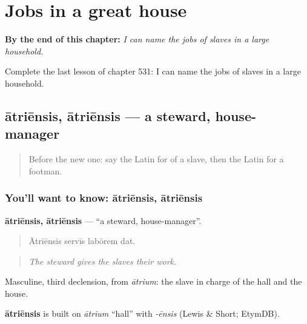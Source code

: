 
\chapter{Jobs in a great house}
\label{ch:la-jobs-in-a-great-house}

\begin{chapteropening}
\textbf{By the end of this chapter:} \emph{I can name the jobs of slaves in a large household.}

Complete the last lesson of chapter 531: I can name the jobs of slaves in a large household.
\end{chapteropening}

\section[ātriēnsis, ātriēnsis]{ātriēnsis, ātriēnsis — a steward, house-manager}

\label{lesson:LA-C531-atriensis}



\begin{quote}
Before the new one: say the Latin for of a slave, then the Latin for a footman.
\end{quote}

\subsection*{You'll want to know: ātriēnsis, ātriēnsis}
\textbf{ātriēnsis, ātriēnsis} — \textquotedblleft{}a steward, house-manager\textquotedblright{}.

\begin{quote}
Ātriēnsis servīs labōrem dat.
\end{quote}

\begin{quote}
\emph{The steward gives the slaves their work.}
\end{quote}

Masculine, third declension, from \emph{ātrium}: the slave in charge of the hall and the house.

\begin{cousinweb}
\textbf{ātriēnsis} is built on \emph{ātrium} \textquotedblleft{}hall\textquotedblright{} with \emph{-ēnsis} (Lewis \& Short; EtymDB).
\end{cousinweb}

